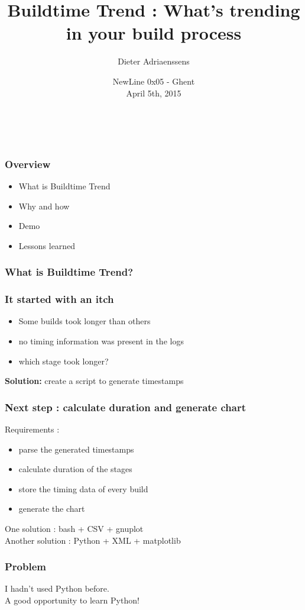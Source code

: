 \documentclass[14pt]{beamer}
\title[Buildtime Trend : What, why and how]{Buildtime Trend : What's trending in your build process}
\author{Dieter Adriaenssens}
\institute[Buildtime Trend]{Buildtime Trend founder, developer - @dcadriaenssens}
\date[NewLine 0x05 5Apr2015]{NewLine 0x05 - Ghent\\
April 5th, 2015}
\begin{document}
  \begin{frame}
    \titlepage
    \vfill
    \begin{center}
      \\[2.5ex]
        {\tiny\CcNote{\CcLongnameByNcSa}}
        \vspace*{-2.5ex}
    \end{center}
  \end{frame}
  \begin{frame}
    \frametitle{Overview}
    \begin{itemize}
      \item What is Buildtime Trend
      \item Why and how
      \item Demo
      \item Lessons learned
    \end{itemize}
  \end{frame}
  \begin{frame}
    \frametitle{What is Buildtime Trend?}
  \end{frame}
  \begin{frame}
    \frametitle{It started with an itch}
    \begin{itemize}
      \item Some builds took longer than others
      \item no timing information was present in the logs
      \item which stage took longer?
    \end{itemize}
    \pause
    \textbf{Solution:} create a script to generate timestamps
  \end{frame}
  \begin{frame}
    \frametitle{Next step : calculate duration and generate chart}
    Requirements :
    \begin{itemize}
      \item parse the generated timestamps
      \item calculate duration of the stages
      \item store the timing data of every build
      \item generate the chart
    \end{itemize}
    \pause
    One solution : bash + CSV + gnuplot\\
    \pause
    Another solution : Python + XML + matplotlib
  \end{frame}
  \begin{frame}
    \frametitle{Problem}
    I hadn't used Python before.\\
    \pause
    A good opportunity to learn Python!
  \end{frame}
\end{document}
